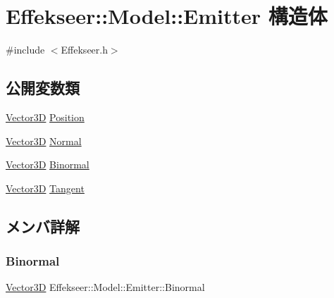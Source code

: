 \hypertarget{struct_effekseer_1_1_model_1_1_emitter}{}\section{Effekseer\+:\+:Model\+:\+:Emitter 構造体}
\label{struct_effekseer_1_1_model_1_1_emitter}


{\ttfamily \#include $<$Effekseer.\+h$>$}

\subsection*{公開変数類}
\begin{DoxyCompactItemize}
\item 
\mbox{\hyperlink{struct_effekseer_1_1_vector3_d}{Vector3D}} \mbox{\hyperlink{struct_effekseer_1_1_model_1_1_emitter_a6279424ea82c1cabc2c5b406f018f790}{Position}}
\item 
\mbox{\hyperlink{struct_effekseer_1_1_vector3_d}{Vector3D}} \mbox{\hyperlink{struct_effekseer_1_1_model_1_1_emitter_a98f905f6c2908fd65aedefc975be677a}{Normal}}
\item 
\mbox{\hyperlink{struct_effekseer_1_1_vector3_d}{Vector3D}} \mbox{\hyperlink{struct_effekseer_1_1_model_1_1_emitter_a092f55d411ff30e52ce759ecc4c2709d}{Binormal}}
\item 
\mbox{\hyperlink{struct_effekseer_1_1_vector3_d}{Vector3D}} \mbox{\hyperlink{struct_effekseer_1_1_model_1_1_emitter_ab4f98e69e1041c999f0f191891fcb140}{Tangent}}
\end{DoxyCompactItemize}


\subsection{メンバ詳解}
\mbox{\label{struct_effekseer_1_1_model_1_1_emitter_a092f55d411ff30e52ce759ecc4c2709d}} 
\subsubsection{\texorpdfstring{Binormal}{Binormal}}
{\footnotesize\ttfamily \mbox{\hyperlink{struct_effekseer_1_1_vector3_d}{Vector3D}} Effekseer\+::\+Model\+::\+Emitter\+::\+Binormal}

